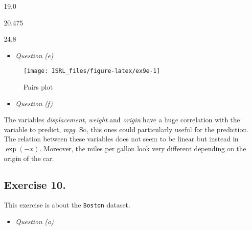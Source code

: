 \documentclass[]{book}
\newenvironment{Shaded}{\begin{snugshade}}{\end{snugshade}}
\newcommand{\DataTypeTok}[1]{\textcolor[rgb]{0.13,0.29,0.53}{#1}}
\newcommand{\KeywordTok}[1]{\textcolor[rgb]{0.13,0.29,0.53}{\textbf{#1}}}
\newcommand{\NormalTok}[1]{#1}
\newcommand{\OperatorTok}[1]{\textcolor[rgb]{0.81,0.36,0.00}{\textbf{#1}}}
\newcommand{\OtherTok}[1]{\textcolor[rgb]{0.56,0.35,0.01}{#1}}
\newcommand{\StringTok}[1]{\textcolor[rgb]{0.31,0.60,0.02}{#1}}
\providecommand{\tightlist}{%
  \setlength{\itemsep}{0pt}\setlength{\parskip}{0pt}}
\begin{document}
19.0

20.475

24.8

\begin{itemize}
\tightlist
\item
  \emph{Question (e)}
\end{itemize}

\begin{figure}

{\centering \texttt{[image: ISRL\_files/figure-latex/ex9e-1]} 

}

\caption{Pairs plot}\label{fig:ex9e}
\end{figure}

\begin{itemize}
\tightlist
\item
  \emph{Question (f)}
\end{itemize}

The variables \emph{displacement}, \emph{weight} and \emph{origin} have a huge correlation with the variable to predict, \emph{mpg}. So, this ones could particularly useful for the prediction. The relation between these variables does not seem to be linear but instead in \(\exp(-x)\). Moreover, the miles per gallon look very different depending on the origin of the car.

\hypertarget{exercise-10.-1}{%
\subsection{Exercise 10.}\label{exercise-10.-1}}

This exercise is about the \texttt{Boston} dataset.

\begin{itemize}
\tightlist
\item
  \emph{Question (a)}
\end{itemize}

\begin{Shaded}
\end{Shaded}
\end{document}
